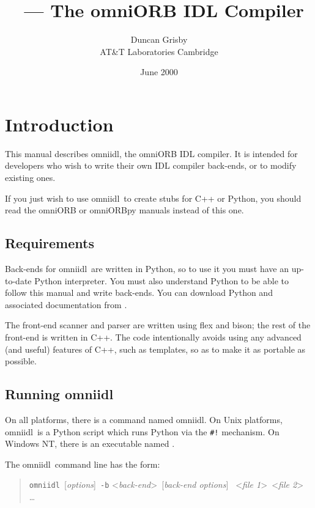 \documentclass[11pt,twoside,a4paper]{article}
\title{\omniidl\ --- The omniORB IDL Compiler}
\author{Duncan Grisby\\
AT\&T Laboratories Cambridge\\
}
\date{June 2000}
\newcommand{\omniidl}{\textsf{omniidl}}
\newcommand{\cmdline}[1]{\texttt{#1}}
\begin{document}
\maketitle


\section{Introduction}

This manual describes \omniidl, the omniORB IDL compiler. It is
intended for developers who wish to write their own IDL compiler
back-ends, or to modify existing ones.

If you just wish to use \omniidl\ to create stubs for C++ or Python,
you should read the omniORB or omniORBpy manuals instead of this one.


\subsection{Requirements}

Back-ends for \omniidl\ are written in Python, so to use it you must
have an up-to-date Python interpreter. You must also understand Python
to be able to follow this manual and write back-ends. You can download
Python and associated documentation from
.

The front-end scanner and parser are written using flex and bison; the
rest of the front-end is written in C++. The code intentionally avoids
using any advanced (and useful) features of C++, such as templates, so
as to make it as portable as possible.


\subsection{Running \omniidl}

On all platforms, there is a command named \omniidl. On Unix
platforms, \omniidl\ is a Python script which runs Python via the
\verb|#!| mechanism. On Windows NT, there is an executable named
.

The \omniidl\ command line has the form:

\begin{quote} %
\cmdline{omniidl }[\textit{options}]\cmdline{ -b}%
<\textit{back-end}>\cmdline{ }[\textit{back-end options}]%
\cmdline{ }<\textit{file 1}>\cmdline{ }<\textit{file 2}>%
\cmdline{ }\dots
\end{quote}
\end{document}
